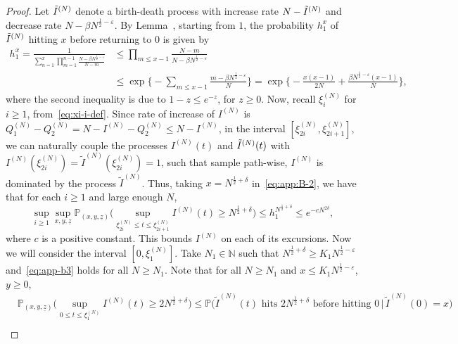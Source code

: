 \documentclass[11pt, reqno]{article}
\numberwithin{equation}{section}
\numberwithin{theorem}{section}
\newcommand{\N}{\mathbb{N}}                 %
\begin{document}
\begin{appendix}
\begin{proof}
Let $\Tilde{I}^{(N)}$ denote a birth-death process with increase rate $N-\Tilde{I}^{(N)}$ and decrease rate $N-\beta N^{\frac{1}{2}-\varepsilon}$.
By Lemma~\cite[Lemma EC.17]{GW19}, starting from $1$, the probability $h_1^x$ of $\Tilde{I}^{(N)}$ hitting $x$ before returning to $0$ is given by 
\begin{equation}\label{eq:app:B-2}
    \begin{split}
        h_1^x=\frac{1}{\sum_{n=1}^x\prod_{m=1}^{n-1}\frac{N-\beta N^{\frac{1}{2}-\varepsilon}}{N-m}}&\leq \prod_{m\leq x-1}\frac{N-m}{N-\beta N^{\frac{1}{2}-\varepsilon}}\\
        &\leq \exp\Big\{-\sum_{m\leq x-1} \frac{m - \beta N^{\frac{1}{2}-\varepsilon}}{N}\Big\}= \exp \Big\{-\frac{x(x-1)}{2N} + \frac{\beta N^{\frac{1}{2}-\varepsilon}(x-1)}{N}\Big\},
    \end{split}
\end{equation}
where the second inequality is due to $1-z\leq e^{-z}$, for $z \ge 0$. 
Now, recall $\xi_i^{
(N)}$ for $i\geq 1$, from~\eqref{eq:xi-i-def}.
Since rate of increase of $I^{(N)}$ is $Q^{(N)}_1-Q^{(N)}_2=N-I^{(N)}-Q^{(N)}_2\leq N-I^{(N)}$, 
in the interval $[\xi^{(N)}_{2i}, \xi^{(N)}_{2i+1}]$, we can naturally couple the processes $I^{(N)}(t)$ and $\Tilde{I}^{(N)}(t)$ with $I^{(N)}(\xi^{(N)}_{2i})=\tilde{I}^{(N)}(\xi^{(N)}_{2i})=1$, such that sample path-wise,
$I^{(N)}$ is dominated by the process $\tilde{I}^{(N)}$.
Thus, taking  $x=N^{\frac{1}{2}+\delta}$ in~\eqref{eq:app:B-2}, we have that for each $i\geq 1$ and large enough $N$, 
\begin{equation}\label{eq:app-b3}
    \sup_{i \ge 1}\sup_{x, y, \underline{z}}\mathbb{P}_{(x, y, \underline{z})}\Big(\sup_{\xi^{(N)}_{2i}\leq t\leq \xi^{(N)}_{2i+1}}I^{(N)}(t)\geq N^{\frac{1}{2}+\delta}\Big)\leq h_1^{N^{\frac{1}{2}+\delta}}\leq e^{-cN^{2\delta}},
\end{equation}
where $c$ is a positive constant. 
This bounds  $I^{(N)}$ on each of its excursions.
Now we will consider the interval $[0, \xi^{(N)}_1]$.
Take $N_1\in \N$ such that $N^{\frac{1}{2}+\delta}\geq K_1 N^{\frac{1}{2}-\varepsilon}$ and~\eqref{eq:app-b3} holds for all $N \ge N_1$. 
Note that for all $N\geq N_1$ and $x\leq K_1N^{\frac{1}{2}-\varepsilon}$, $y \ge 0$,
\begin{align*}
    &\mathbb{P}_{(x, y, \underline{z})}\Big(\sup_{0\leq t\leq \xi^{(N)}_1}I^{(N)}(t)\geq 2N^{\frac{1}{2}+\delta}\Big) \le \mathbb{P}\Big(\tilde I^{(N)}(t) \text{ hits } 2N^{\frac{1}{2}+\delta} \text{ before hitting } 0 \, \vert \, \tilde I^{(N)}(0) = x\Big)\\

\end{align*}
\end{proof}
\end{appendix}
\end{document}
